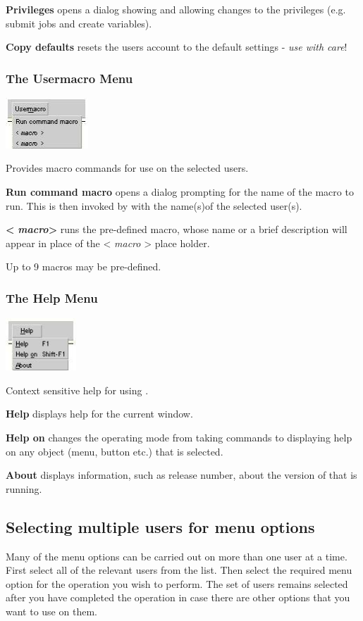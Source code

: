 \textbf{Privileges} opens a dialog showing and allowing changes to the privileges (e.g. submit jobs and create variables).

\textbf{Copy defaults} resets the users account to the default settings - \textit{use with care}!

\subsubsection{The Usermacro Menu}
 \includegraphics[width=3.089cm,height=1.901cm]{img/ref51.jpg} 

Provides macro commands for use on the selected users.

\textbf{Run command macro} opens a dialog prompting for the name of the macro to run. This is then invoked by \PrXmbtuser{}
with the name(s)of the selected user(s).

\textbf{{\textless} }\textbf{\textit{macro}}\textbf{ {\textgreater}} runs the pre-defined macro, whose name or a brief description will
appear in place of the {\textless} \textit{macro} {\textgreater} place holder.

Up to 9 macros may be pre-defined.

\subsubsection{The Help Menu}
 \includegraphics[width=2.641cm,height=1.983cm]{img/ref52.jpg} 

Context sensitive help for using \PrXmbtuser{}.

\textbf{Help} displays help for the current window.

\textbf{Help on} changes the operating mode from taking commands to displaying help on any object (menu, button etc.) that is selected.

\textbf{About} displays information, such as release number, about the version of \PrXmbtuser{} that is running.

\subsection{Selecting multiple users for menu options}
Many of the menu options can be carried out on more than one user at a time. First select all of the relevant users from the list. Then select
the required menu option for the operation you wish to perform. The set of users remains selected after you have completed the operation in
case there are other options that you want to use on them.


